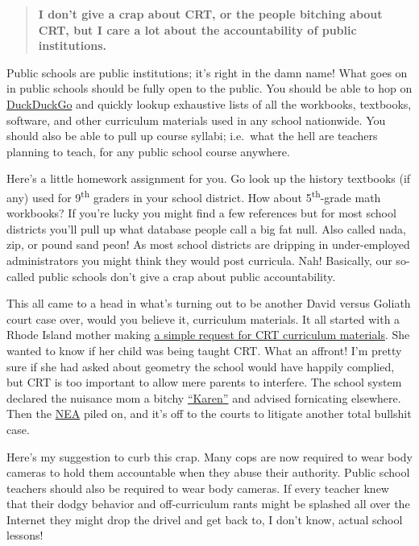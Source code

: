 \begin{quote}
\textbf{I don't give a crap about CRT, or the people bitching about CRT,
but I care a lot about the accountability of public institutions.}
\end{quote}

Public schools are public institutions; it's right in the damn name!
What goes on in public schools should be fully open to the public. You
should be able to hop on \href{https://duckduckgo.com/}{DuckDuckGo} and
quickly lookup exhaustive lists of all the workbooks, textbooks,
software, and other curriculum materials used in any school nationwide.
You should also be able to pull up course syllabi; i.e.~what the hell
are teachers planning to teach, for any public school course anywhere.

Here's a little homework assignment for you. Go look up the history
textbooks (if any) used for 9\textsuperscript{th} graders in your school
district. How about 5\textsuperscript{th}-grade math workbooks? If
you're lucky you might find a few references but for most school
districts you'll pull up what database people call a big fat null. Also
called nada, zip, or pound sand peon! As most school districts are
dripping in under-employed administrators you might think they would post curricula.
Nah! Basically, our so-called public schools
don't give a crap about public accountability.

This all came to a head in what's turning out to be another David versus
Goliath court case over, would you believe it, curriculum materials. It
all started with a Rhode Island mother making
\href{https://nypost.com/2021/08/05/teachers-union-sues-mom-over-requests-for-crt-curriculum-info/}{a
simple request for CRT curriculum materials}. She wanted to know if her
child was being taught CRT. What an affront! I'm pretty sure if she had
asked about geometry the school would have happily complied,
but CRT is too important to allow mere parents to interfere. The school
system declared the nuisance mom a bitchy \href{https://www.dictionary.com/e/slang/karen/}{``Karen''} and advised
fornicating elsewhere. Then the \href{https://www.nea.org/}{NEA} piled on, and it's off to the courts
to litigate another total bullshit case.


Here's my suggestion to curb this crap. Many cops are now required to
wear body cameras to hold them accountable when they abuse their
authority. Public school teachers should also be required to wear body
cameras. If every teacher knew that their dodgy behavior and
off-curriculum rants might be splashed all over the Internet they might
drop the drivel and get back to, I don't know, actual school lessons!

